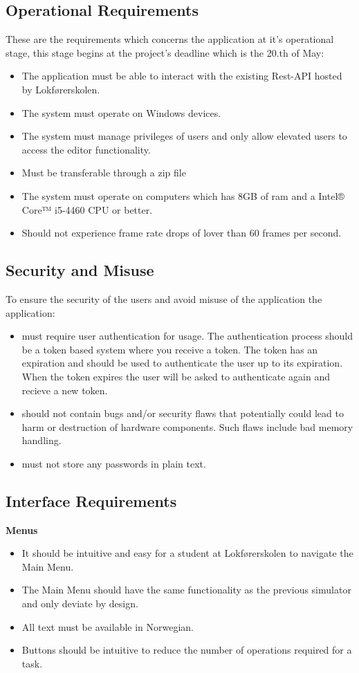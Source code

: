 \subsection{Operational Requirements}
These are the requirements which concerns the application at it's operational stage, this stage begins at the project's deadline which is the 20.th of May:
\begin{itemize}
    \item The application must be able to interact with the existing Rest-API hosted by Lokførerskolen.
    \item The system must operate on Windows devices.
    \item The system must manage privileges of users and only allow elevated users to access the editor functionality.
    \item Must be transferable through a zip file
    \item The system must operate on computers which has 8GB of ram and a Intel® Core™ i5-4460 CPU or better. 
    \item Should not experience frame rate drops of lover than 60 frames per second. 
\end{itemize} 


\subsection{Security and Misuse}
To ensure the security of the users and avoid misuse of the application the application:
\begin{itemize}
    \item must require user authentication for usage. The authentication process should be a token based system where you receive a token. The token has an expiration and should be used to authenticate the user up to its expiration. When the token expires the user will be asked to authenticate again and recieve a new token. %
    \item should not contain bugs and/or security flaws that potentially could lead to harm or destruction of hardware components. Such flaws include bad memory handling.
    \item must not store any passwords in plain text.
\end{itemize}


\subsection{Interface Requirements}
\textbf{Menus} 
\begin{itemize}
    \item It should  be intuitive and easy for a student at Lokførerskolen to navigate the Main Menu. 
    \item The Main Menu should have the same functionality as the previous simulator and only deviate by design.
    \item All text must be available in Norwegian.
    \item Buttons should be intuitive to reduce the number of operations required for a task.
\end{itemize}

